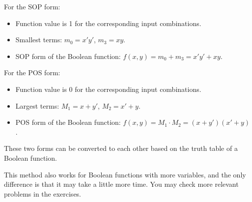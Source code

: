     \begin{solution}
                For the SOP form:
                \begin{itemize}
                    \item Function value is 1 for the corresponding input combinations.
                    \item Smallest terms: $m_0 = x'y'$, $m_3 = xy$.
                    \item SOP form of the Boolean function: $f(x, y) = m_0 + m_3 = x'y' + xy$.
                \end{itemize}
            
                For the POS form:
                \begin{itemize}
                    \item Function value is 0 for the corresponding input combinations.
                    \item Largest terms: $M_1 = x + y'$, $M_2 = x' + y$.
                    \item POS form of the Boolean function: $f(x, y) = M_1 \cdot M_2 = (x + y')(x' + y)$.
                \end{itemize}
                
             These two forms can be converted to each other based on the truth table of a Boolean function.
            \end{solution}

    This method also works for Boolean functions with more variables, and the only difference is that it may take a little more time.
    You may check more relevant problems in the exercises.

